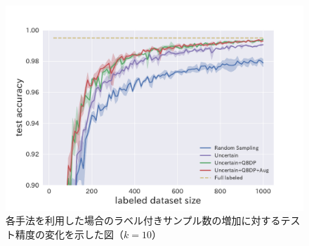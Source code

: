 


\begin{figure}[h]
     \begin{center}
      \includegraphics[width=12cm]{figures/mnist_acc_graph.pdf}
     \end{center}
    \caption{\label{fig:mnist_acc_graph}各手法を利用した場合のラベル付きサンプル数の増加に対するテスト精度の変化を示した図（$k=10$）}
\end{figure}


